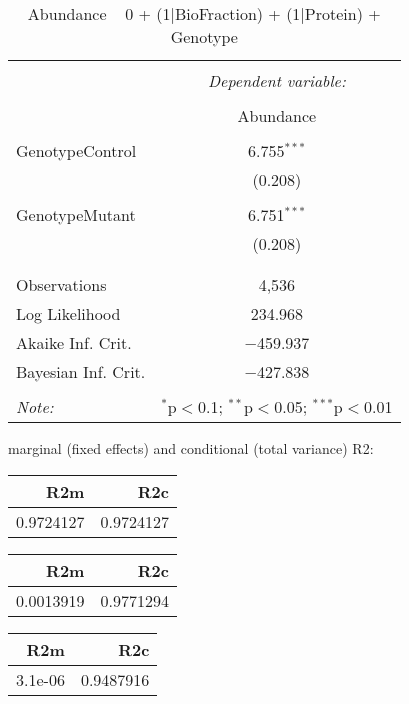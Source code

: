 \documentclass[11pt]{report}
\begin{document}
\begin{table}[!htbp] \centering 
  \caption{Abundance ~ 0 + (1|BioFraction) + (1|Protein) + Genotype} 
  \label{} 
\begin{tabular}{@{\extracolsep{5pt}}lc} 
\\[-1.8ex]\hline 
\hline \\[-1.8ex] 
 & \multicolumn{1}{c}{\textit{Dependent variable:}} \\ 
\cline{2-2} 
\\[-1.8ex] & Abundance \\ 
\hline \\[-1.8ex] 
 GenotypeControl & 6.755$^{***}$ \\ 
  & (0.208) \\ 
  & \\ 
 GenotypeMutant & 6.751$^{***}$ \\ 
  & (0.208) \\ 
  & \\ 
\hline \\[-1.8ex] 
Observations & 4,536 \\ 
Log Likelihood & 234.968 \\ 
Akaike Inf. Crit. & $-$459.937 \\ 
Bayesian Inf. Crit. & $-$427.838 \\ 
\hline 
\hline \\[-1.8ex] 
\textit{Note:}  & \multicolumn{1}{r}{$^{*}$p$<$0.1; $^{**}$p$<$0.05; $^{***}$p$<$0.01} \\ 
\end{tabular} 
\end{table} 
marginal (fixed effects) and conditional (total variance) R2:

\begin{tabular}{r|r}
\hline
R2m & R2c\\
\hline
0.9724127 & 0.9724127\\
\hline
\end{tabular}

\begin{tabular}{r|r}
\hline
R2m & R2c\\
\hline
0.0013919 & 0.9771294\\
\hline
\end{tabular}

\begin{tabular}{r|r}
\hline
R2m & R2c\\
\hline
3.1e-06 & 0.9487916\\
\hline
\end{tabular}
\end{document}
